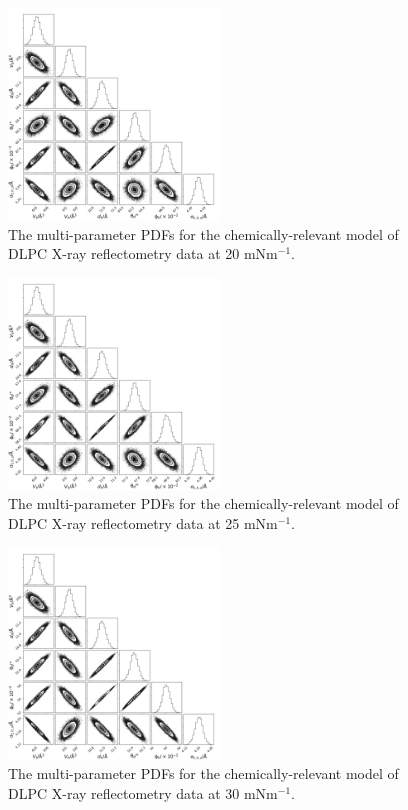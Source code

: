 \documentclass[11pt,a4paper]{paper}
\begin{document}
\begin{figure}[H]
	\centering
	\includegraphics[width=0.50\textwidth]{figures/dlpc1_all_corner}
	\caption{The multi-parameter PDFs for the chemically-relevant model of DLPC X-ray reflectometry data at 20 mNm$^{-1}$.}
	\label{fig:dlpc2}
\end{figure}
\begin{figure}[H]
	\centering
	\includegraphics[width=0.50\textwidth]{figures/dlpc2_all_corner}
	\caption{The multi-parameter PDFs for the chemically-relevant model of DLPC X-ray reflectometry data at 25 mNm$^{-1}$.}
	\label{fig:dlpc3}
\end{figure}
\begin{figure}[H]
	\centering
	\includegraphics[width=0.50\textwidth]{figures/dlpc3_all_corner}
	\caption{The multi-parameter PDFs for the chemically-relevant model of DLPC X-ray reflectometry data at 30 mNm$^{-1}$.}
	\label{fig:dlpc4}
\end{figure}
\end{document}
